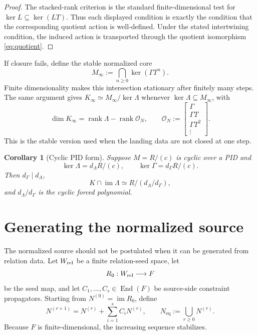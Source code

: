 \documentclass[11pt]{article}
\newtheorem{corollary}[theorem]{Corollary}
\theoremstyle{definition}
\newcommand{\im}{\operatorname{im}}
\newcommand{\End}{\operatorname{End}}
\newcommand{\rankp}{\operatorname{rank}}
\newcommand{\Neq}{N_{\mathrm{eq}}}
\begin{document}
\begin{proof}
The stacked-rank criterion is the standard finite-dimensional test for
\(\ker L\subseteq\ker(LT)\). Thus each displayed condition is exactly the condition that the
corresponding quotient action is well-defined. Under the stated intertwining condition, the induced
action is transported through the quotient isomorphism \eqref{eq:quotient}.
\end{proof}

If closure fails, define the stable normalized core
\begin{equation}
M_\infty:=\bigcap_{n\geq 0}\ker(\Gamma T^n).
\label{eq:stablecore}
\end{equation}
Finite dimensionality makes this intersection stationary after finitely many steps. The same
argument gives \(K_\infty\simeq M_\infty/\ker\Lambda\) whenever \(\ker\Lambda\subseteq M_\infty\), with
\[
\dim K_\infty=\rankp\Lambda-\rankp\mathcal O_N,
\qquad
\mathcal O_N:=\begin{bmatrix}\Gamma\\\Gamma T\\\Gamma T^2\\\vdots\end{bmatrix}.
\]
This is the stable version used when the landing data are not closed at one step.

\begin{corollary}[Cyclic PID form]
Suppose \(M=R/(c)\) is cyclic over a PID and
\[
\ker\Lambda=d_\Lambda R/(c),
\qquad
\ker\Gamma=d_\Gamma R/(c).
\]
Then \(d_\Gamma\mid d_\Lambda\),
\[
K\cap\im\Lambda\simeq R/(d_\Lambda/d_\Gamma),
\]
and \(d_\Lambda/d_\Gamma\) is the cyclic forced polynomial.
\end{corollary}

\section{Generating the normalized source}

The normalized source should not be postulated when it can be generated from relation data. Let
\(W_{\rm rel}\) be a finite relation-seed space, let
\[
R_0:W_{\rm rel}\longrightarrow F
\]
be the seed map, and let \(C_1,\ldots,C_s\in\End(F)\) be source-side constraint propagators.
Starting from \(N^{(0)}=\im R_0\), define
\begin{equation}
N^{(r+1)}=N^{(r)}+\sum_{i=1}^s C_iN^{(r)},
\qquad
\Neq:=\bigcup_{r\geq 0}N^{(r)}.
\label{eq:closure}
\end{equation}
Because \(F\) is finite-dimensional, the increasing sequence stabilizes.
\end{document}
